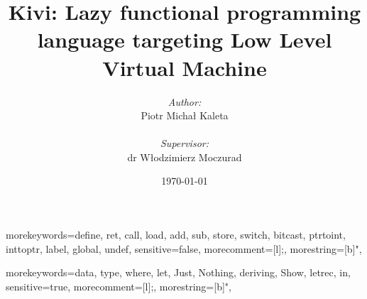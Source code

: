 \documentclass[12pt,a4paper]{report}
\begin{document}

  {morekeywords={define, ret, call, load, add, sub, store, switch, bitcast,
  ptrtoint, inttoptr, label, global, undef},
  sensitive=false,
  morecomment=[l]{;},
  morestring=[b]",
}

  {morekeywords={data, type, where, let, Just, Nothing, deriving, Show, letrec,
  in},
  sensitive=true,
  morecomment=[l]{;},
  morestring=[b]",
}



\title{Kivi: Lazy functional programming language targeting Low Level Virtual Machine}
\author{\textit{Author:}\\Piotr Micha\l{} Kaleta\\\\\emph{Supervisor:}\\dr W\l{}odzimierz Moczurad}
\date{\today}

\maketitle

\newpage
\thispagestyle{empty}
\mbox{}

\onehalfspace
\end{document}
